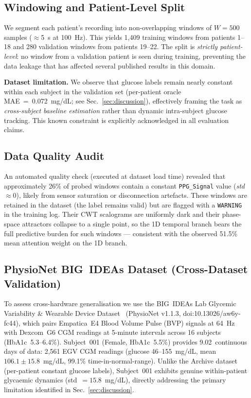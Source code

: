\documentclass[conference]{IEEEtran}
\begin{document}
\subsection{Windowing and Patient-Level Split}
We segment each patient's recording into non-overlapping windows of
$W=500$ samples ($\approx$5~s at 100~Hz).  This yields 1,409 training windows
from patients 1--18 and 280 validation windows from patients 19--22.
The split is \emph{strictly patient-level}: no window from a validation patient
is seen during training, preventing the data leakage that has affected several
published results in this domain.

\textbf{Dataset limitation.}
We observe that glucose labels remain nearly constant within each subject in
the validation set (per-patient oracle MAE~=~0.072~mg/dL;
see Sec.~\ref{sec:discussion}), effectively framing the task as
\emph{cross-subject baseline estimation} rather than dynamic intra-subject
glucose tracking.
This known constraint is explicitly acknowledged in all evaluation claims.

\subsection{Data Quality Audit}
An automated quality check (executed at dataset load time) revealed that
approximately 26\% of probed windows contain a constant
\texttt{PPG\_Signal} value (\textit{std}$\approx$0), likely from sensor
saturation or disconnection artefacts.  These windows are retained in the
dataset (the label remains valid) but are flagged with a \texttt{WARNING}
in the training log.  Their CWT scalograms are uniformly dark and their
phase-space attractors collapse to a single point, so the 1D temporal branch
bears the full predictive burden for such windows --- consistent with the
observed 51.5\% mean attention weight on the 1D branch.

\subsection{PhysioNet BIG~IDEAs Dataset (Cross-Dataset Validation)}
\label{sec:bigideas}

To assess cross-hardware generalisation we use the BIG~IDEAs Lab Glycemic
Variability \& Wearable Device Dataset~\cite{bigideas2023}
(PhysioNet v1.1.3, doi:10.13026/aw6y-fc44), which pairs Empatica~E4
Blood Volume Pulse (BVP) signals at 64~Hz with Dexcom~G6 CGM readings at
5-minute intervals across 16 subjects (HbA1c~5.3--6.4\%).
Subject~001 (Female, HbA1c~5.5\%) provides 9.02~continuous days of data:
2,561 EGV CGM readings (glucose 46--155~mg/dL,
mean~$106.1\pm15.8$~mg/dL, 99.1\% time-in-normal-range).
Unlike the Archive dataset (per-patient constant glucose labels),
Subject~001 exhibits genuine within-patient glycaemic dynamics
(std~$=15.8$~mg/dL), directly addressing the primary limitation identified
in Sec.~\ref{sec:discussion}.
\end{document}
